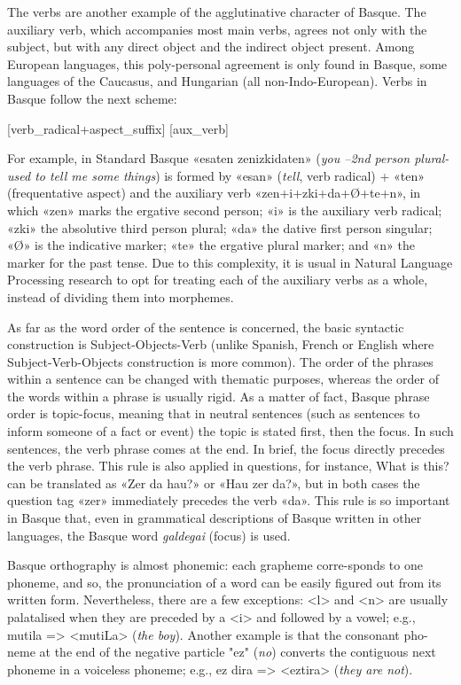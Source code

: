 \begin{multicols}{2}
The verbs are another example of the agglutinative character of Basque. The auxiliary verb, which accompanies most main verbs, agrees not only with the subject, but with any direct object and the indirect object present. Among European languages, this poly-personal agreement is only found in Basque, some languages of the Caucasus, and Hungarian (all non-Indo-European). Verbs in Basque follow the next scheme:

\hspace{10pt} [verb\_radical+aspect\_suffix] [aux\_verb]

For example, in Standard Basque «esaten zenizkidaten» (\textit{you –2nd person plural- used to tell me some things}) is formed by «esan» (\textit{tell}, verb radical) + «ten» (frequentative aspect) and the auxiliary verb «zen+i+zki+da+Ø+te+n», in which «zen» marks the ergative second person; «i» is the auxiliary verb radical; «zki» the absolutive third person plural; «da» the dative first person singular; «Ø» is the indicative marker; «te» the ergative plural marker; and «n» the marker for the past tense. Due to this complexity, it is usual in Natural Language Processing research to opt for treating each of the auxiliary verbs as a whole, instead of dividing them into morphemes.

As far as the word order of the sentence is concerned, the basic syntactic construction is Subject-Objects-Verb (unlike Spanish, French or English where Subject-Verb-Objects construction is more common). The order of the phrases within a sentence can be changed with thematic purposes, whereas the order of the words within a phrase is usually rigid. As a matter of fact, Basque phrase order is topic-focus, meaning that in neutral sentences (such as sentences to inform someone of a fact or event) the topic is stated first, then the focus. In such sentences, the verb phrase comes at the end. In brief, the focus directly precedes the verb phrase. This rule is also applied in questions, for instance, What is this? can be translated as «Zer da hau?» or «Hau zer da?», but in both cases the question tag «zer» immediately precedes the verb «da». This rule is so important in Basque that, even in grammatical descriptions of Basque written in other languages, the Basque word \textit{galdegai} (focus) is used.

Basque orthography is almost phonemic: each grapheme corre-sponds to one phoneme, and so, the pronunciation of a word can be easily figured out from its written form. Nevertheless, there are a few exceptions: <l> and <n> are usually palatalised when they are preceded by a <i> and followed by a vowel; e.g., mutila => <mutiLa> (\textit{the boy}). Another example is that the consonant pho-neme at the end of the negative particle "ez" (\textit{no}) converts the contiguous next phoneme in a voiceless phoneme; e.g., ez dira => <eztira> (\textit{they are not}). 


\end{multicols}
